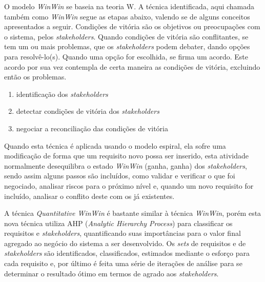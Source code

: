 \begin{description}
\setlength{\itemsep}{1pt}
\setlength{\itemindent}{20pt}
\item [I \textit{WinWin}:]

O modelo \textit{WinWin} se baseia na teoria W. A técnica identificada, aqui
chamada também como \textit{WinWin} segue as etapas abaixo, valendo se de alguns
conceitos apresentados a seguir.
Condições de vitória são os objetivos ou
preocupações com o sistema, pelos \textit{stakeholders}. Quando condições de
vitória são conflitantes, se tem um ou mais problemas, que os
\textit{stakeholders} podem debater, dando opções para resolvê-lo(s). Quando uma
opção for escolhida, se firma um acordo. Este acordo por sua vez contempla de certa maneira as condições de vitória, excluindo
então os problemas.

 \begin{enumerate}
\item identificação dos \textit{stakeholders}
\item detectar condições de vitória dos \textit{stakeholders}
\item negociar a reconciliação das condições de vitória
 \end{enumerate}

Quando esta técnica é aplicada usando o modelo espiral, ela sofre uma
modificação de forma que um requisito novo possa ser inserido, esta atividade
normalmente desequilibra o estado \textit{WinWin} (ganha, ganha) dos
\textit{stakeholders}, sendo assim alguns passos são incluídos, como validar e
verificar o que foi negociado, analisar riscos para o próximo nível e, quando um
novo requisito for incluído, analisar o conflito deste com os já existentes.

\item [II \textit{Quantitative WinWin}:]

A técnica \textit{Quantitative WinWin} é bastante similar à técnica
\textit{WinWin}, porém esta nova técnica utiliza AHP (\textit{Analytic
Hierarchy Process}) para classificar os requisitos e \textit{stakeholders},
quantificando suas importâncias para o valor final agregado ao negócio do sistema a ser desenvolvido.
Os \textit{sets} de requisitos e de \textit{stakeholders} são identificados,
classificados, estimados mediante o esforço para cada requisito e, por último
é feita uma série de iterações de análise para se determinar o resultado ótimo
em termos de agrado aos \textit{stakeholders}.

\item [III MPARN:]


\end{description}
